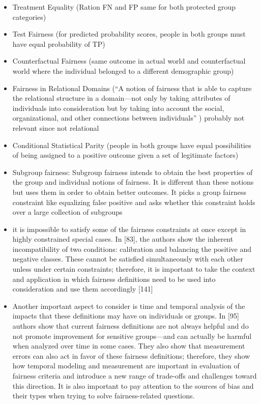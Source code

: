 \documentclass[12pt, a4paper, oneside]{book}   	%
\newif\ifrawcitationactive
\newcommand{\rawcitationend}{
	\color{black}\rawcitationactivefalse
}
\newcommand{\rawcitationusedend}{%
	\ifrawcitationactive
	\color{purple}  %
	\else
	\color{black}  %
	\fi
}
\begin{document}
\begin{itemize}
\begin{itemize}
					\item Treatment Equality (Ration FN and FP same for both protected group categories) \autocite{Mehrabi_2021}
					\item Test Fairness (for predicted probability scores, people in both groups must have equal probability of TP) \autocite{Mehrabi_2021}
					\item Counterfactual Fairness (same outcome in actual world and counterfactual world where the individual belonged to a different demographic group) \autocite{Mehrabi_2021}
					\item Fairness in Relational Domains (“A notion of fairness that is able to capture the relational structure in a domain—not only by taking attributes of individuals into consideration but by taking into account the social, organizational, and other connections between individuals” \autocite{M50_Farnadi_2018}) \autocite{Mehrabi_2021} probably not relevant since not relational
					\item Conditional Statistical Parity (people in both groups have equal possibilities of being assigned to a positive outcome given a set of legitimate factors) \autocite{Mehrabi_2021}
					\item Subgroup fairness: Subgroup fairness intends to obtain the best properties of the group and individual notions of fairness. It is different than these notions but uses them in order to obtain better outcomes. It picks a group fairness constraint like equalizing false positive and asks whether this constraint holds over a large collection of subgroups
					\rawcitationusedend
					\autocite{M79_Kearns_2018}\autocite{M80_Kearns_2019}\autocite{Mehrabi_2021}
					\item it is impossible to satisfy some of the fairness constraints at once except in highly constrained special cases. In [83], the authors show the inherent incompatibility of two conditions: calibration and balancing the positive and negative classes. These cannot be satisfied simultaneously with each other unless under certain constraints; therefore, it is important to take the context and application in which fairness definitions need to be used into consideration and use them accordingly [141]\autocite{Mehrabi_2021}
					\item Another important aspect to consider is time and temporal analysis of the impacts that these definitions may have on individuals or groups. In [95] authors show that current fairness definitions are not always helpful and do not promote improvement for sensitive groups—and can actually be harmful when analyzed over time in some cases. They also show that measurement errors can also act in favor of these fairness definitions; therefore, they show how temporal modeling and measurement are important in evaluation of fairness criteria and introduce a new range of trade-offs and challenges toward this direction. It is also important to pay attention to the sources of bias and their types when trying to solve fairness-related questions. \autocite{Mehrabi_2021}
				\end{itemize}
			\end{itemize}
			\rawcitationend
			
\end{document}
